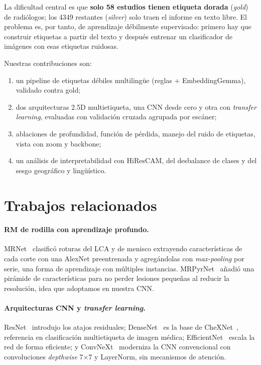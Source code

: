 \documentclass{article}
\begin{document}
La dificultad central es que \textbf{solo 58 estudios tienen etiqueta dorada} (\emph{gold}) de radiólogos; los 4349 restantes (\emph{silver}) solo traen el informe en texto libre. El problema es, por tanto, de aprendizaje débilmente supervisado: primero hay que construir etiquetas a partir del texto y después entrenar un clasificador de imágenes con esas etiquetas ruidosas.

Nuestras contribuciones son:
\begin{enumerate}
  \item un pipeline de etiquetas débiles multilingüe (reglas + EmbeddingGemma), validado contra gold;
  \item dos arquitecturas 2.5D multietiqueta, una CNN desde cero y otra con \emph{transfer learning}, evaluadas con validación cruzada agrupada por escáner;
  \item ablaciones de profundidad, función de pérdida, manejo del ruido de etiquetas, vista con zoom y backbone;
  \item un análisis de interpretabilidad con HiResCAM, del desbalance de clases y del sesgo geográfico y lingüístico.
\end{enumerate}

\section{Trabajos relacionados}

\paragraph{RM de rodilla con aprendizaje profundo.} MRNet~\cite{bien2018mrnet} clasificó roturas del LCA y de menisco extrayendo características de cada corte con una AlexNet preentrenada y agregándolas con \emph{max-pooling} por serie, una forma de aprendizaje con múltiples instancias. MRPyrNet~\cite{dunnhofer2021mrpyrnet} añadió una pirámide de características para no perder lesiones pequeñas al reducir la resolución, idea que adoptamos en nuestra CNN.

\paragraph{Arquitecturas CNN y \emph{transfer learning}.} ResNet~\cite{he2016resnet} introdujo los atajos residuales; DenseNet~\cite{huang2017densenet} es la base de CheXNet~\cite{rajpurkar2017chexnet}, referencia en clasificación multietiqueta de imagen médica; EfficientNet~\cite{tan2019efficientnet} escala la red de forma eficiente; y ConvNeXt~\cite{liu2022convnext} moderniza la CNN convencional con convoluciones \emph{depthwise} 7×7 y LayerNorm, sin mecanismos de atención.
\end{document}
